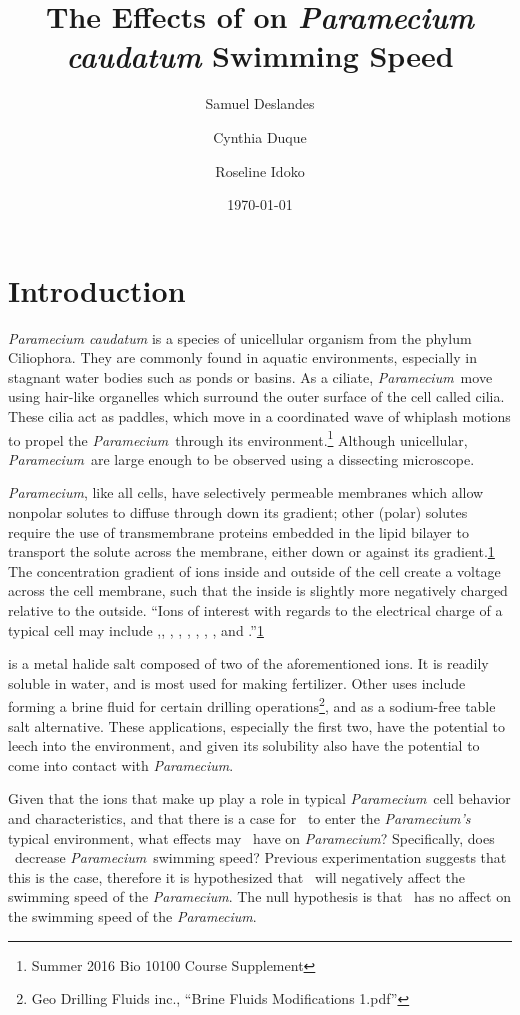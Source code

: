 \documentclass[12pt]{article}
\newcommand{\p}{\textit{Paramecium}}
\newcommand{\kcl}{\ce{KCl}}
\begin{document}
\title{The Effects of  on \textit{Paramecium caudatum} Swimming Speed}
\author{Samuel Deslandes \and Cynthia Duque \and Roseline Idoko}
\date{\today}
\maketitle
\doublespace
\section{Introduction}
	\textit{Paramecium caudatum} is a species of unicellular organism from the phylum Ciliophora. They are commonly found in aquatic environments, especially in stagnant water bodies such as ponds or basins. As a ciliate, \p\ move using hair-like organelles which surround the outer surface of the cell called cilia. These cilia act as paddles, which move in a coordinated wave of whiplash motions to propel the \p\ through its environment.\footnote{\label{first}Summer 2016 Bio 10100 Course Supplement} Although unicellular, \p\ are large enough to be observed using a dissecting microscope.  
	
	\p, like all cells, have selectively permeable membranes which allow nonpolar solutes to diffuse through down its gradient; other (polar) solutes require the use of transmembrane proteins embedded in the lipid bilayer to transport the solute across the membrane, either down or against its gradient.\cref{first} The concentration gradient of ions inside and outside of the cell create a voltage across the cell membrane, such that the inside is slightly more negatively charged relative to the outside. ``Ions of interest with regards to the electrical charge of a typical cell may include ,, , , , , , , and .''\cref{first}
		 
	 is a metal halide salt composed of two of the aforementioned ions. It is readily soluble in water, and is most used for making fertilizer. Other uses include forming a brine fluid for certain drilling operations\footnote{Geo Drilling Fluids inc., ``Brine Fluids Modifications 1.pdf''}, and as a sodium-free table salt alternative. These applications, especially the first two, have the potential to leech into the environment, and given its solubility also have the potential to come into contact with \p.
	
	Given that the ions that make up  play a role in typical \p\ cell behavior and characteristics, and that there is a case for \kcl\ to enter the \textit{Paramecium's} typical environment, what effects may \kcl\ have on \p? Specifically, does \kcl\ decrease \p\ swimming speed? Previous experimentation suggests that this is the case, therefore it is hypothesized that \kcl\ will negatively affect the swimming speed of the \p. The null hypothesis is that \kcl\ has no affect on the swimming speed of the \p.   
	
\end{document}
